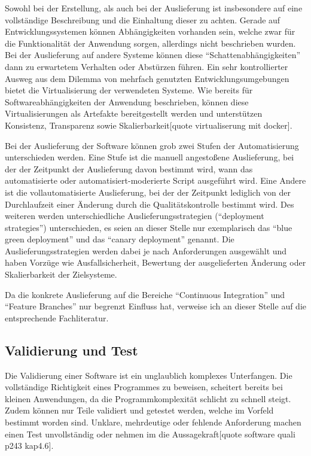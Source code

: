 Sowohl bei der Erstellung, als auch bei der Auslieferung ist insbesondere auf eine vollständige Beschreibung und die Einhaltung dieser zu achten. Gerade auf Entwicklungssystemen können Abhängigkeiten vorhanden sein, welche zwar für die Funktionalität der Anwendung sorgen, allerdings nicht beschrieben wurden. Bei der Auslieferung auf andere Systeme können diese ``Schattenabhängigkeiten'' dann zu erwartetem Verhalten oder Abstürzen führen. Ein sehr kontrollierter Ausweg aus dem Dilemma von mehrfach genutzten Entwicklungsumgebungen bietet die Virtualisierung der verwendeten Systeme. Wie bereits für Softwareabhängigkeiten der Anwendung beschrieben, können diese Virtualisierungen als Artefakte bereitgestellt werden und unterstützen Konsistenz, Transparenz sowie Skalierbarkeit[quote virtualiserung mit docker].

Bei der Auslieferung der Software können grob zwei Stufen der Automatisierung unterschieden werden. Eine Stufe ist die manuell angestoßene Auslieferung, bei der der Zeitpunkt der Auslieferung davon bestimmt wird, wann das automatisierte oder automatisiert-moderierte Script ausgeführt wird. Eine Andere ist die vollautomatisierte Auslieferung, bei der der Zeitpunkt lediglich von der Durchlaufzeit einer Änderung durch die Qualitätskontrolle bestimmt wird.
Des weiteren werden unterschiedliche Auslieferungsstrategien (``deployment strategies'') unterschieden, es seien an dieser Stelle nur exemplarisch das ``blue green deployment'' und das ``canary deployment'' genannt. Die Auslieferungsstrategien werden dabei je nach Anforderungen ausgewählt und haben Vorzüge wie Ausfallsicherheit, Bewertung der ausgelieferten Änderung oder Skalierbarkeit der Zielsysteme.

Da die konkrete Auslieferung auf die Bereiche ``Continuous Integration'' und ``Feature Branches'' nur begrenzt Einfluss hat, verweise ich an dieser Stelle auf die entsprechende Fachliteratur.

\subsection{Validierung und Test}

Die Validierung einer Software ist ein unglaublich komplexes Unterfangen. Die vollständige Richtigkeit eines Programmes zu beweisen, scheitert bereits bei kleinen Anwendungen, da die Programmkomplexität schlicht zu schnell steigt. Zudem können nur Teile validiert und getestet werden, welche im Vorfeld bestimmt worden sind. Unklare, mehrdeutige oder fehlende Anforderung machen einen Test unvollständig oder nehmen im die Aussagekraft[quote software quali p243 kap4.6].

